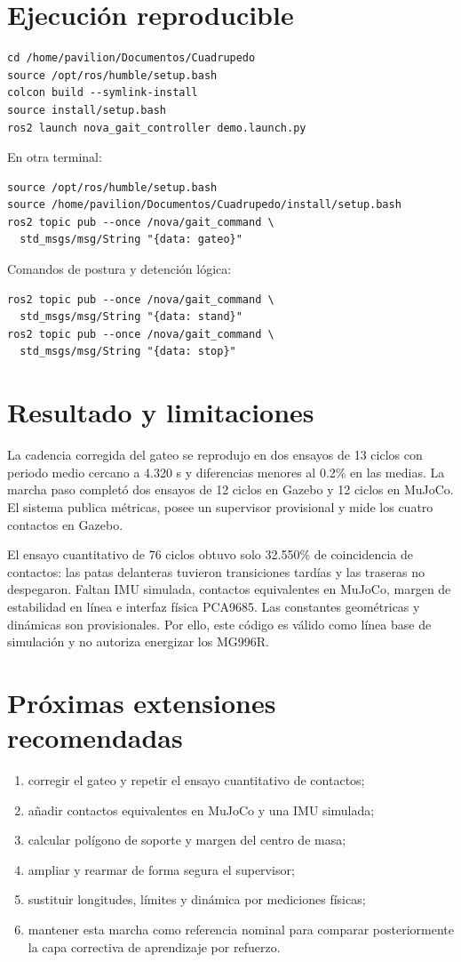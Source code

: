 \documentclass[11pt,a4paper]{article}
\begin{document}
\section{Ejecución reproducible}
\begin{lstlisting}[style=yaml]
cd /home/pavilion/Documentos/Cuadrupedo
source /opt/ros/humble/setup.bash
colcon build --symlink-install
source install/setup.bash
ros2 launch nova_gait_controller demo.launch.py
\end{lstlisting}
En otra terminal:
\begin{lstlisting}[style=yaml]
source /opt/ros/humble/setup.bash
source /home/pavilion/Documentos/Cuadrupedo/install/setup.bash
ros2 topic pub --once /nova/gait_command \
  std_msgs/msg/String "{data: gateo}"
\end{lstlisting}
Comandos de postura y detención lógica:
\begin{lstlisting}[style=yaml]
ros2 topic pub --once /nova/gait_command \
  std_msgs/msg/String "{data: stand}"
ros2 topic pub --once /nova/gait_command \
  std_msgs/msg/String "{data: stop}"
\end{lstlisting}

\section{Resultado y limitaciones}
La cadencia corregida del gateo se reprodujo en dos ensayos de 13 ciclos con
periodo medio cercano a 4.320 s y diferencias menores al 0.2\% en las medias.
La marcha paso completó dos ensayos de 12 ciclos en Gazebo y 12 ciclos en
MuJoCo. El sistema publica métricas, posee un supervisor provisional y mide los
cuatro contactos en Gazebo.

El ensayo cuantitativo de 76 ciclos obtuvo solo 32.550\% de coincidencia de
contactos: las patas delanteras tuvieron transiciones tardías y las traseras no
despegaron. Faltan IMU simulada, contactos equivalentes en MuJoCo, margen de
estabilidad en línea e interfaz física PCA9685.
Las constantes geométricas y dinámicas son provisionales. Por ello, este código
es válido como línea base de simulación y no autoriza energizar los MG996R.

\section{Próximas extensiones recomendadas}
\begin{enumerate}
\item corregir el gateo y repetir el ensayo cuantitativo de contactos;
\item añadir contactos equivalentes en MuJoCo y una IMU simulada;
\item calcular polígono de soporte y margen del centro de masa;
\item ampliar y rearmar de forma segura el supervisor;
\item sustituir longitudes, límites y dinámica por mediciones físicas;
\item mantener esta marcha como referencia nominal para comparar posteriormente
  la capa correctiva de aprendizaje por refuerzo.
\end{enumerate}
\end{document}
